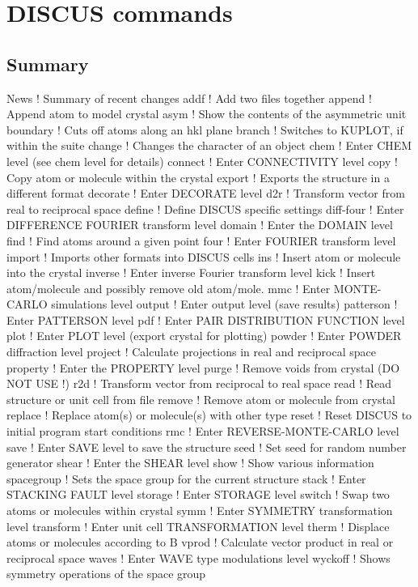 \chapter{DISCUS commands}
\section{Summary}
\par
\begin{MacVerbatim}
News       ! Summary of recent changes
addf       ! Add two files together
append     ! Append atom to model crystal
asym       ! Show the contents of the asymmetric unit
boundary   ! Cuts off atoms along an hkl plane
branch     ! Switches to KUPLOT, if within the suite
change     ! Changes the character of an object
chem       ! Enter CHEM level (see chem level for details)
connect    ! Enter CONNECTIVITY level
copy       ! Copy atom or molecule within the crystal
export     ! Exports the structure in a different format
decorate   ! Enter  DECORATE level
d2r        ! Transform vector from real to reciprocal space
define     ! Define DISCUS specific settings
diff-four  ! Enter DIFFERENCE FOURIER transform level
domain     ! Enter the DOMAIN level
find       ! Find atoms around a given point
four       ! Enter FOURIER transform level
import     ! Imports other formats into DISCUS cells
ins        ! Insert atom or molecule into the crystal
inverse    ! Enter inverse Fourier transform level
kick       ! Insert atom/molecule and possibly remove old atom/mole.
mmc        ! Enter MONTE-CARLO simulations level
output     ! Enter output level (save results)
patterson  ! Enter PATTERSON level
pdf        ! Enter PAIR DISTRIBUTION FUNCTION level
plot       ! Enter PLOT level (export crystal for plotting)
powder     ! Enter POWDER diffraction level
project    ! Calculate projections in real and reciprocal space
property   ! Enter the PROPERTY level
purge      ! Remove voids from crystal (DO NOT USE !)
r2d        ! Transform vector from reciprocal to real space
read       ! Read structure or unit cell from file
remove     ! Remove atom or molecule from crystal
replace    ! Replace atom(s) or molecule(s) with other type
reset      ! Reset DISCUS to initial program start conditions
rmc        ! Enter REVERSE-MONTE-CARLO level
save       ! Enter SAVE level to save the structure
seed       ! Set seed for random number generator
shear      ! Enter the SHEAR level
show       ! Show various information
spacegroup ! Sets the space group for the current structure
stack      ! Enter STACKING FAULT level
storage    ! Enter STORAGE level
switch     ! Swap two atoms or molecules within crystal
symm       ! Enter SYMMETRY transformation level
transform  ! Enter unit cell TRANSFORMATION  level
therm      ! Displace atoms or molecules according to B
vprod      ! Calculate vector product in real or reciprocal space
waves      ! Enter WAVE type modulations level
wyckoff    ! Shows symmetry operations of the space group
\end{MacVerbatim}
